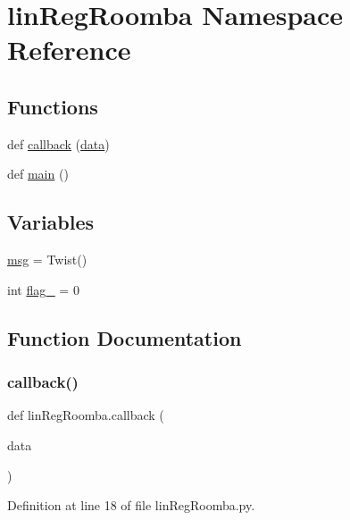 \hypertarget{namespacelinRegRoomba}{}\section{lin\+Reg\+Roomba Namespace Reference}
\label{namespacelinRegRoomba}
\subsection*{Functions}
\begin{DoxyCompactItemize}
\item 
def \mbox{\hyperlink{namespacelinRegRoomba_a5f05f15c1e16613c112c4a2bbf15476a}{callback}} (\mbox{\hyperlink{structdata}{data}})
\item 
def \mbox{\hyperlink{namespacelinRegRoomba_af5e99ac36e42ad425a87275a39d7f297}{main}} ()
\end{DoxyCompactItemize}
\subsection*{Variables}
\begin{DoxyCompactItemize}
\item 
\mbox{\hyperlink{namespacelinRegRoomba_a157f27eb0ee84026933a46a45ece071b}{msg}} = Twist()
\item 
int \mbox{\hyperlink{namespacelinRegRoomba_ab69f9401c1bcd62410c52e043cee85ae}{flag\+\_}} = 0
\end{DoxyCompactItemize}


\subsection{Function Documentation}
\mbox{\label{namespacelinRegRoomba_a5f05f15c1e16613c112c4a2bbf15476a}} 
\subsubsection{\texorpdfstring{callback()}{callback()}}
{\footnotesize\ttfamily def lin\+Reg\+Roomba.\+callback (\begin{DoxyParamCaption}\item[{}]{data }\end{DoxyParamCaption})}



Definition at line 18 of file lin\+Reg\+Roomba.\+py.


